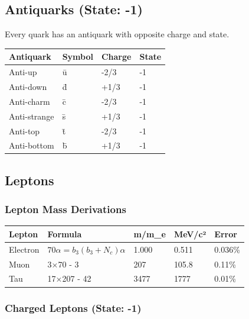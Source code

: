 \documentclass[
  11pt,
  letterpaper,
  twoside,
  openright]{book}
\begin{document}
\subsection{Antiquarks (State: -1)}\label{antiquarks-state--1}

Every quark has an antiquark with opposite charge and state.

\begin{longtable}[]{@{}llll@{}}
\toprule\noalign{}
Antiquark & Symbol & Charge & State \\
\midrule\noalign{}
\endhead
\bottomrule\noalign{}
\endlastfoot
Anti-up & ū & -2/3 & -1 \\
Anti-down & d̄ & +1/3 & -1 \\
Anti-charm & c̄ & -2/3 & -1 \\
Anti-strange & s̄ & +1/3 & -1 \\
Anti-top & t̄ & -2/3 & -1 \\
Anti-bottom & b̄ & +1/3 & -1 \\
\end{longtable}

\subsection{Leptons}\label{leptons}

\subsubsection{Lepton Mass Derivations}\label{lepton-mass-derivations}

\begin{longtable}[]{@{}lllll@{}}
\toprule\noalign{}
Lepton & Formula & m/m\_e & MeV/c² & Error \\
\midrule\noalign{}
\endhead
\bottomrule\noalign{}
\endlastfoot
Electron & \(70\alpha = b_3(b_3+N_c)\alpha\) & 1.000 & 0.511 &
0.036\% \\
Muon & 3×70 - 3 & 207 & 105.8 & 0.11\% \\
Tau & 17×207 - 42 & 3477 & 1777 & 0.01\% \\
\end{longtable}

\subsubsection{Charged Leptons (State:
-1)}\label{charged-leptons-state--1}
\end{document}
